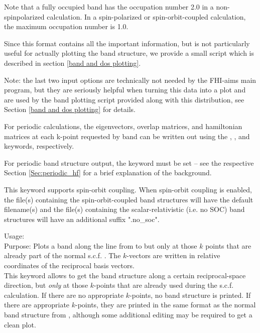 Note that a fully occupied band has the occupation number 2.0 in a
non-spinpolarized calculation. In a spin-polarized or
spin-orbit-coupled calculation, the maximum occupation number is 1.0.

Since this format contains all the important information,
but is not particularly useful for actually plotting the band
structure, we provide a small script which is described in
section \ref{band and dos plotting}.

Note: the last two input options are technically not needed by the
FHI-aims main program, but they are seriously helpful when
turning this data into a plot and are used by the band plotting
script provided along with this distribution, see Section
\ref{band and dos plotting} for details.

For periodic calculations, the eigenvectors, overlap matrices, and
hamiltonian matrices at each k-point requested by
  {band}
can be written out using the
 ,
 , and
  keywords,
respectively.

For periodic band structure output, the
 keyword must be set -- see the
respective Section \ref{Sec:periodic_hf} for a brief explanation of
the background.

This keyword supports spin-orbit coupling.  When spin-orbit coupling is
enabled, the file(s) containing the spin-orbit-coupled band structures
will have the default filename(s) and the file(s) containing the
scalar-relativistic (i.e. no SOC) band structures will have an additional
suffix ".no\_soc".

{
  Usage:    \\[1.0ex]
  Purpose: Plots a band along the line from
     to
   but only at those $k$ points that are
  already part of the normal s.c.f. . The
  $k$-vectors are written in relative
  coordinates of the reciprocal basis vectors. \\
}
This keyword allows to get the band structure along a certain
reciprocal-space direction, but \emph{only} at those $k$-points that
are already used during the s.c.f. calculation. If there are no
appropriate $k$-points, no band structure is printed. If there are
appropriate $k$-points, they are printed in the same format as the
normal band structure from ,
although some additional editing may be required to get a clean plot.


